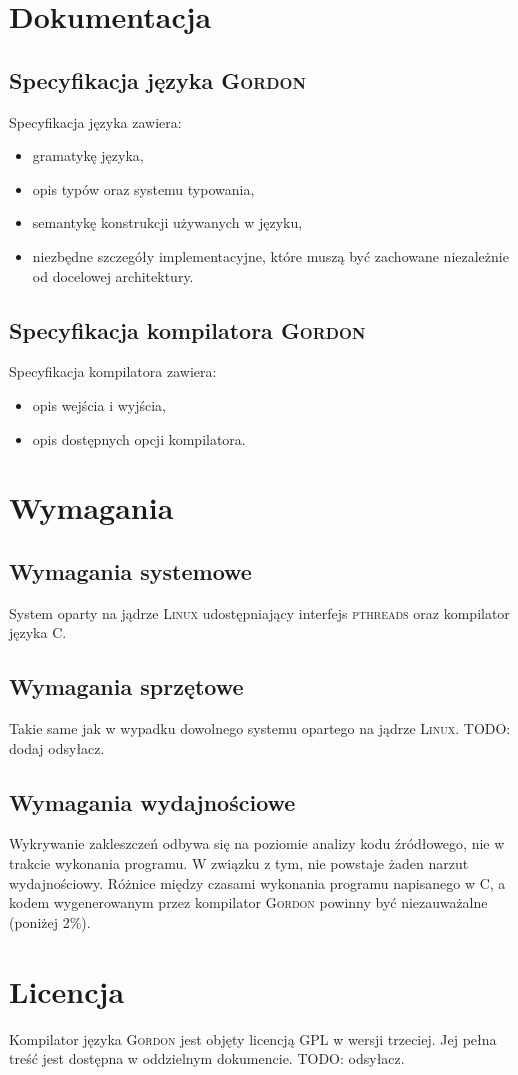 \documentclass{documentation}
\begin{document}
\section{Dokumentacja}
\subsection{Specyfikacja języka \textsc{Gordon}}
\noindent Specyfikacja języka zawiera:
\begin{itemize}
\item gramatykę języka,
\item opis typów oraz systemu typowania,
\item semantykę konstrukcji używanych w języku,
\item niezbędne szczegóły implementacyjne, które muszą być zachowane niezależnie od docelowej architektury.
\end{itemize}

\subsection{Specyfikacja kompilatora \textsc{Gordon}}
\noindent Specyfikacja kompilatora zawiera:
\begin{itemize}
\item opis wejścia i wyjścia,
\item opis dostępnych opcji kompilatora.
\end{itemize}

\section{Wymagania}
\subsection{Wymagania systemowe}
\noindent System oparty na jądrze \textsc{Linux} udostępniający interfejs \textsc{pthreads} oraz kompilator języka C.

\subsection{Wymagania sprzętowe}
\noindent Takie same jak w wypadku dowolnego systemu opartego na jądrze \textsc{Linux}. TODO: dodaj odsyłacz.

\subsection{Wymagania wydajnościowe}
\noindent Wykrywanie zakleszczeń odbywa się na poziomie analizy kodu źródłowego, nie w trakcie wykonania programu. W związku z tym, nie powstaje żaden narzut wydajnościowy. Różnice między czasami wykonania programu napisanego w C, a kodem wygenerowanym przez kompilator \textsc{Gordon} powinny być niezauważalne (poniżej 2\%).

\section{Licencja}
\noindent Kompilator języka \textsc{Gordon} jest objęty licencją GPL w wersji trzeciej. Jej pełna treść jest dostępna w oddzielnym dokumencie. TODO: odsyłacz.
\end{document}
